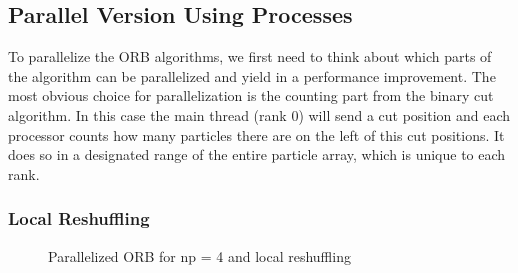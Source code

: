 \documentclass[]{article}
\begin{document}
\subsection{Parallel Version Using Processes}

To parallelize the ORB algorithms, we first need to think about which parts of the algorithm can be parallelized and yield in a performance improvement. The most obvious choice for parallelization is the counting part from the binary cut algorithm. In this case the main thread (rank 0) will send a cut position and each processor counts how many particles there are on the left of this cut positions. It does so in a designated range of the entire particle array, which is unique to each rank.

\subsubsection{Local Reshuffling}

\begin{figure}[H]
	\begin{center}
	\end{center}
\caption{Parallelized ORB for np = 4 and local reshuffling}
\label{fig:orb_parallel}
\end{figure}
\end{document}

